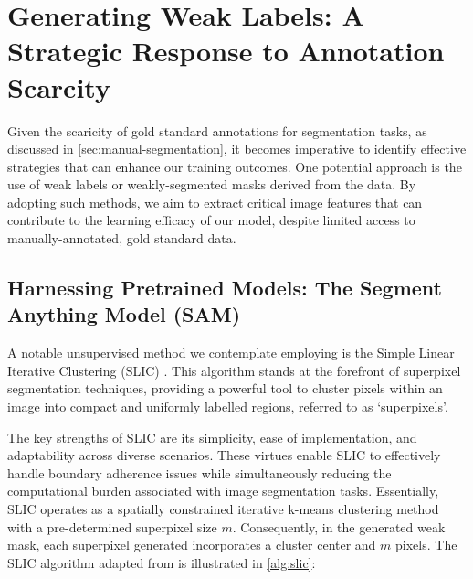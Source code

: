 \section{Generating Weak Labels: A Strategic Response to Annotation Scarcity}

Given the scaricity of gold standard annotations for segmentation tasks, as discussed in \autoref{sec:manual-segmentation}, it becomes imperative to identify effective strategies that can enhance our training outcomes. One potential approach is the use of weak labels or weakly-segmented masks derived from the data. By adopting such methods, we aim to extract critical image features that can contribute to the learning efficacy of our model, despite limited access to manually-annotated, gold standard data.

\subsection{Harnessing Pretrained Models: The Segment Anything Model (SAM)}

A notable unsupervised method we contemplate employing is the Simple Linear Iterative Clustering (SLIC) \cite{achanta2010slic}. This algorithm stands at the forefront of superpixel segmentation techniques, providing a powerful tool to cluster pixels within an image into compact and uniformly labelled regions, referred to as `superpixels'.

The key strengths of SLIC are its simplicity, ease of implementation, and adaptability across diverse scenarios. These virtues enable SLIC to effectively handle boundary adherence issues while simultaneously reducing the computational burden associated with image segmentation tasks. Essentially, SLIC operates as a spatially constrained iterative k-means clustering method with a pre-determined superpixel size \(m\). Consequently, in the generated weak mask, each superpixel generated incorporates a cluster center and \(m\) pixels. The SLIC algorithm adapted from \cite{achanta2010slic} is illustrated in \autoref{alg:slic}:


